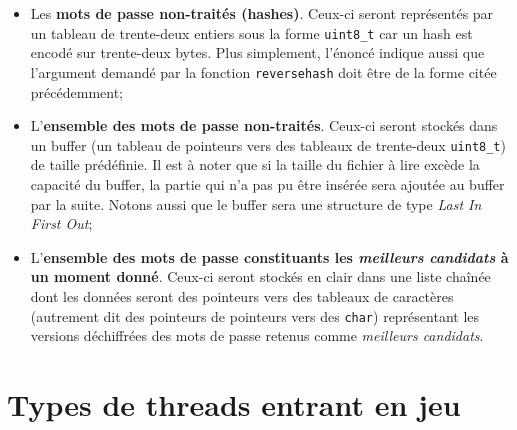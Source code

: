 \documentclass{article}
\begin{document}
	\begin{itemize}
		\item 
		Les \textbf{mots de passe non-traités (hashes)}.
		Ceux-ci seront représentés par un tableau de trente-deux entiers sous la forme \lstinline{uint8_t} car un hash est encodé sur trente-deux bytes.
		Plus simplement, l'énoncé indique aussi que l'argument demandé par la fonction \lstinline{reversehash} doit être de la forme citée précédemment;
		
		\item 
		L'\textbf{ensemble des mots de passe non-traités}. Ceux-ci seront stockés dans un buffer (un tableau de pointeurs vers des tableaux de trente-deux \lstinline{uint8_t}) de taille prédéfinie. Il est à noter que si la taille du fichier à lire excède la capacité du buffer, la partie qui n'a pas pu être insérée sera ajoutée au buffer par la suite. Notons aussi que le buffer sera une structure de type \textit{Last In First Out};
		
		\item %
		L'\textbf{ensemble des mots de passe constituants les \textit{meilleurs candidats} à un moment donné}.
		Ceux-ci seront stockés en clair dans une liste chaînée dont les données seront des pointeurs vers des tableaux de caractères (autrement dit des pointeurs de pointeurs vers des \lstinline{char}) représentant les versions déchiffrées des mots de passe retenus comme \textit{meilleurs candidats}.
		
		
	\end{itemize}
	
\section{Types de threads entrant en jeu}
	
\end{document}
